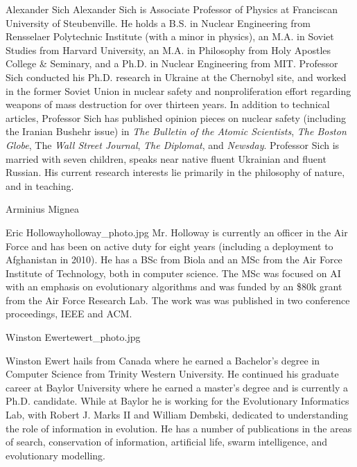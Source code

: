
\begin{authorbio}{Alexander Sich}{}
Alexander Sich is Associate Professor of Physics at Franciscan University of Steubenville. He holds a B.S. in Nuclear Engineering from Rensselaer Polytechnic Institute (with a minor in physics), an M.A. in Soviet Studies from Harvard University, an M.A. in Philosophy from Holy Apostles College \& Seminary, and a Ph.D. in Nuclear Engineering from MIT.  Professor Sich conducted his Ph.D. research in Ukraine at the Chernobyl site, and worked in the former Soviet Union in nuclear safety and nonproliferation effort regarding weapons of mass destruction for over thirteen years. In addition to technical articles, Professor Sich has published opinion pieces on nuclear safety (including the Iranian Bushehr issue) in \emph{The Bulletin of the Atomic Scientists}, \emph{The Boston Globe}, The \emph{Wall Street Journal}, \emph{The Diplomat}, and \emph{Newsday}. Professor Sich is married with seven children, speaks near native fluent Ukrainian and fluent Russian. His current research interests lie primarily in the philosophy of nature, and in teaching.
\end{authorbio}

\begin{authorbio}{Arminius Mignea}{}

\end{authorbio}

\begin{authorbio}{Eric Holloway}{holloway_photo.jpg}
Mr. Holloway is currently an officer in the Air Force and has been on
active duty for eight years (including a deployment to Afghanistan in
2010). He has a BSc from Biola and an MSc from the Air Force Institute
of Technology, both in computer science. The MSc was focused on AI
with an emphasis on evolutionary algorithms and was funded by an \$80k
grant from the Air Force Research Lab. The work was was published in
two conference proceedings, IEEE and ACM.
\end{authorbio}

\begin{authorbio}{Winston Ewert}{ewert_photo.jpg}

Winston Ewert hails from Canada where he earned a Bachelor's degree in Computer Science from Trinity Western University. He continued his graduate career at Baylor University where he earned a master's degree and is currently a Ph.D. candidate. While at Baylor he is working for the Evolutionary Informatics Lab, with Robert J. Marks II and William Dembski, dedicated to understanding the role of information in evolution. He has a number of publications in the areas of search, conservation of information, artificial life, swarm intelligence, and evolutionary modelling. 
\end{authorbio}


